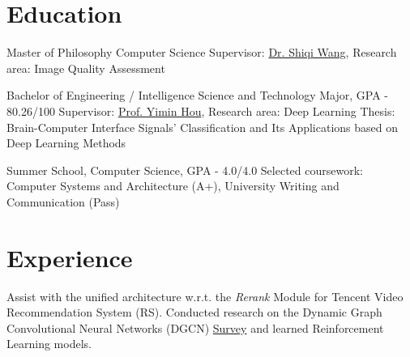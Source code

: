 \documentclass{my_cv}
\begin{document}
\hspace*{\fill}


\hspace*{\fill}


\hspace*{\fill} 

\section{Education}
\workitemstwo
{Master of Philosophy Computer Science}
{Supervisor: \href{https://www.cs.cityu.edu.hk/~shiqwang/}{Dr. Shiqi Wang}, Research area: Image Quality Assessment}

\workitemsthree
{Bachelor of Engineering / Intelligence Science and Technology Major, GPA - 80.26/100}
{Supervisor: \href{mailto:ymh7821@163.com}{Prof. Yimin Hou}, Research area: Deep Learning}
{Thesis: Brain-Computer Interface Signals' Classification and Its Applications based on Deep Learning Methods}

\workitemstwo
{Summer School, Computer Science, GPA - 4.0/4.0}
{Selected coursework: Computer Systems and Architecture (A+), University Writing and Communication (Pass)}

\hspace*{\fill} 

\section{Experience}
\workitemstwo
{Assist with the unified architecture w.r.t. the \emph{Rerank} Module for Tencent Video Recommendation System (RS).}
{Conducted research on the Dynamic Graph Convolutional Neural Networks (DGCN) \href{https://shuyuej.com/files/Dynamic-GCN-Survey.pdf}{Survey} and learned Reinforcement Learning models.}
\end{document}
